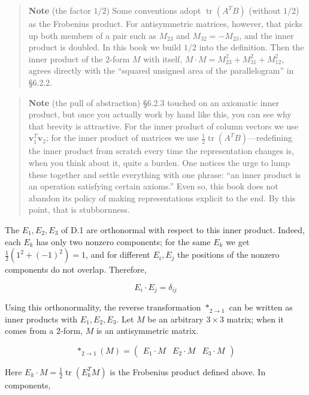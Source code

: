 \documentclass[a4paper,12pt,openany]{book}
\begin{document}
\begin{quote}
\textbf{Note} (the factor \(1/2\)) Some conventions adopt
\(\operatorname{tr}(A^T B)\) (without \(1/2\)) as the Frobenius product.
For antisymmetric matrices, however, that picks up both members of a
pair such as \(M_{23}\) and \(M_{32}=-M_{23}\), and the inner product is
doubled. In this book we build \(1/2\) into the definition. Then the
inner product of the \(2\)-form \(M\) with itself,
\(M\cdot M=M_{23}^2+M_{31}^2+M_{12}^2\), agrees directly with the
``squared unsigned area of the parallelogram'' in §6.2.2.
\end{quote}

\begin{quote}
\textbf{Note} (the pull of abstraction) §6.2.3 touched on an axiomatic
inner product, but once you actually work by hand like this, you can see
why that brevity is attractive. For the inner product of column vectors
we use \(\mathbf{v}_1^T \mathbf{v}_2\); for the inner product of
matrices we use \(\frac{1}{2}\operatorname{tr}(A^T B)\)—redefining the
inner product from scratch every time the representation changes is,
when you think about it, quite a burden. One notices the urge to lump
these together and settle everything with one phrase: ``an inner product
is an operation satisfying certain axioms.'' Even so, this book does not
abandon its policy of making representations explicit to the end. By
this point, that is stubbornness.
\end{quote}

The \(E_1,E_2,E_3\) of D.1 are orthonormal with respect to this inner
product. Indeed, each \(E_k\) has only two nonzero components; for the
same \(E_k\) we get \(\frac{1}{2}(1^2+(-1)^2)=1\), and for different
\(E_i,E_j\) the positions of the nonzero components do not overlap.
Therefore,

\[
E_i\cdot E_j=\delta_{ij}
\]

Using this orthonormality, the reverse transformation \(\ast_{2\to1}\)
can be written as inner products with \(E_1,E_2,E_3\). Let \(M\) be an
arbitrary \(3\times3\) matrix; when it comes from a \(2\)-form, \(M\) is
an antisymmetric matrix.

\[
\ast_{2\to1}(M)
=
\begin{pmatrix}
E_1\cdot M & E_2\cdot M & E_3\cdot M
\end{pmatrix}
\]

Here \(E_k\cdot M=\frac{1}{2}\operatorname{tr}(E_k^T M)\) is the
Frobenius product defined above. In components,
\end{document}
